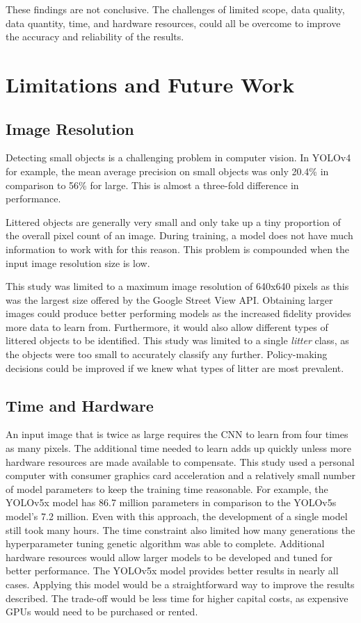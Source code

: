 \documentclass{thesis}
\begin{document}
These findings are not conclusive. The challenges of limited scope, data quality, data quantity, time, and hardware resources, could all be overcome to improve the accuracy and reliability of the results.

\section{Limitations and Future Work}

\subsection{Image Resolution}

Detecting small objects is a challenging problem in computer vision. In YOLOv4 for example, the mean average precision on small objects was only 20.4\% in comparison to 56\% for large\cite{yolov4}. This is almost a three-fold difference in performance.

Littered objects are generally very small and only take up a tiny proportion of the overall pixel count of an image. During training, a model does not have much information to work with for this reason. This problem is compounded when the input image resolution size is low.

This study was limited to a maximum image resolution of 640x640 pixels as this was the largest size offered by the Google Street View API. Obtaining larger images could produce better performing models as the increased fidelity provides more data to learn from. Furthermore, it would also allow different types of littered objects to be identified. This study was limited to a single \textit{litter} class, as the objects were too small to accurately classify any further. Policy-making decisions could be improved if we knew what types of litter are most prevalent.

\subsection{Time and Hardware}

An input image that is twice as large requires the CNN to learn from four times as many pixels. The additional time needed to learn adds up quickly unless more hardware resources are made available to compensate. This study used a personal computer with consumer graphics card acceleration and a relatively small number of model parameters to keep the training time reasonable. For example, the YOLOv5x model has 86.7 million parameters in comparison to the YOLOv5s model's 7.2 million. Even with this approach, the development of a single model still took many hours. The time constraint also limited how many generations the hyperparameter tuning genetic algorithm was able to complete. Additional hardware resources would allow larger models to be developed and tuned for better performance. The YOLOv5x model provides better results in nearly all cases\cite{better-training-results}. Applying this model would be a straightforward way to improve the results described. The trade-off would be less time for higher capital costs, as expensive GPUs would need to be purchased or rented.
\end{document}
